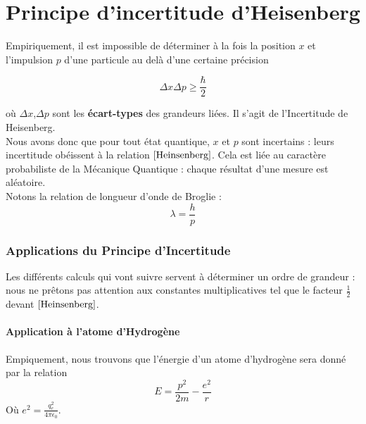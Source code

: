 \documentclass[../Notes de cours]{subfiles}
\begin{document}
\part{Principe d'incertitude d'Heisenberg}
Empiriquement, il est impossible de déterminer à la fois la position $x$ et l'impulsion $p$ d'une particule au delà d'une certaine précision

\begin{equation}
\label{Heinsenberg}
\Delta x \Delta p \geq \frac{\hbar}{2}
\end{equation}

où $\Delta x$,$\Delta p$ sont les \textbf{écart-types} des grandeurs liées. Il s'agit de l'Incertitude de Heisenberg.\\

Nous avons donc que pour tout état quantique, $x$ et $p$ sont incertains : leurs incertitude obéissent à la relation $\ref{Heinsenberg}$. Cela est liée au caractère probabiliste de la Mécanique Quantique : chaque résultat d'une mesure est aléatoire.\\

Notons la relation de longueur d'onde de Broglie : 
\begin{equation}
\label{Broglie}
\lambda = \frac{h}{p}
\end{equation}

\section{Applications du Principe d'Incertitude}
Les différents calculs qui vont suivre servent à déterminer un ordre de grandeur : nous ne prêtons pas attention aux constantes multiplicatives tel que le facteur $\frac{1}{2}$ devant $\ref{Heinsenberg}$.
\subsection{Application à l'atome d'Hydrogène}
Empiquement, nous trouvons que l'énergie d'un atome d'hydrogène sera donné par la relation
\begin{equation}
\label{Energie hydrogène}
E = \frac{p^2}{2m} - \frac{e^2}{r}
\end{equation}
Où $e^2 = \frac{q_e^2}{4 \pi \epsilon_0}$.\\
\end{document}

